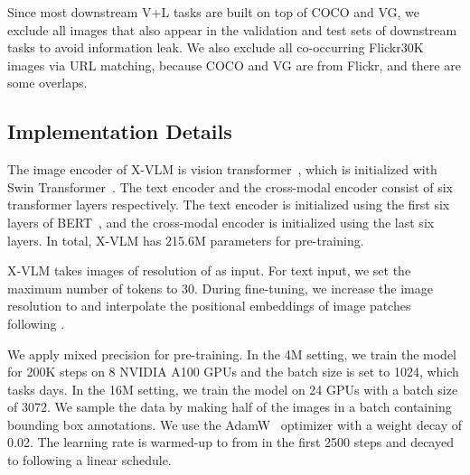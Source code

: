\documentclass[nohyperref]{article}
\theoremstyle{plain}
\theoremstyle{definition}
\theoremstyle{remark}
\begin{document}
Since most downstream V+L tasks are built on top of COCO and VG,  we exclude all images that also appear in the validation and test sets of downstream tasks to avoid information leak. We also exclude all co-occurring Flickr30K~\cite{plummer2015flickr30k} images via URL matching, because COCO and VG are from Flickr, and there are some overlaps. 


\subsection{Implementation Details}
\label{sec:details}


The image encoder of X-VLM is vision transformer~\cite{dosovitskiy2020image}, which is initialized with Swin Transformer~\cite{liu2021swin}. The text encoder and the cross-modal encoder consist of six transformer layers respectively. The text encoder is initialized using the first six layers of BERT~\cite{devlin2019bert}, and the cross-modal encoder is initialized using the last six layers. In total, X-VLM has 215.6M parameters for pre-training. 


X-VLM takes images of resolution of  as input. For text input, we set the maximum number of tokens to 30. During fine-tuning, we increase the image resolution to  and interpolate the positional embeddings of image patches following \citet{dosovitskiy2020image}. 


We apply mixed precision for pre-training. In the 4M setting, we train the model for 200K steps on 8 NVIDIA A100 GPUs and the batch size is set to 1024, which tasks  days. In the 16M setting, we train the model on 24 GPUs with a batch size of 3072. We sample the data by making half of the images in a batch containing bounding box annotations. We use the AdamW~\cite{loshchilov2018decoupled} optimizer with a weight decay of 0.02. The learning rate is warmed-up to  from  in the first 2500 steps and decayed to  following a linear schedule.
\end{document}
